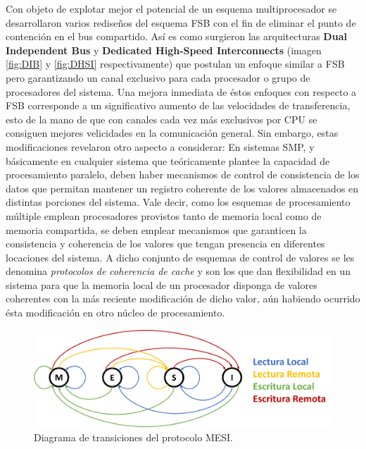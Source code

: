 Con objeto de explotar mejor el potencial de un esquema multiprocesador se desarrollaron varios rediseños del esquema FSB con el fin de eliminar el punto de contención en el bus compartido. Así es como surgieron las arquitecturas \textbf{Dual Independent Bus} y \textbf{Dedicated High-Speed Interconnects} (imagen \ref{fig:DIB} y \ref{fig:DHSI} respectivamente) que postulan un enfoque similar a FSB pero garantizando un canal exclusivo para cada procesador o grupo de procesadores del sistema. Una mejora inmediata de éstos enfoques con respecto a FSB corresponde a un significativo aumento de las velocidades de transferencia, esto de la mano de que con canales cada vez más exclusivos por CPU se consiguen mejores velicidades en la comunicación general. Sin embargo, estas modificaciones revelaron otro aspecto a considerar: En sistemas SMP, y básicamente en cualquier sistema que teóricamente plantee la capacidad de procesamiento paralelo, deben haber mecanismos de control de consistencia de los datos que permitan mantener un registro coherente de los valores almacenados en distintas porciones del sistema. Vale decir, como los esquemas de procesamiento múltiple emplean procesadores provistos tanto de memoria local como de memoria compartida, se deben emplear mecanismos que garanticen la consistencia y coherencia de los valores que tengan presencia en diferentes locaciones del sistema. A dicho conjunto de esquemas de control de valores se les denomina \emph{protocolos de coherencia de cache} y son los que dan flexibilidad en un sistema para que la memoria local de un procesador disponga de valores coherentes con la más reciente modificación de dicho valor, aún habiendo ocurrido ésta modificación en otro núcleo de procesamiento.

\begin{figure}[!h]
	\centering
	\includegraphics[scale=0.3]{imagenes/MESI.png}
	\caption{Diagrama de transiciones del protocolo MESI.}
	\label{fig:MESI}
\end{figure}

